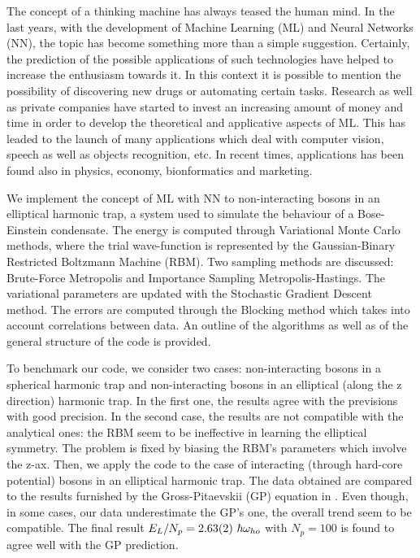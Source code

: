 The concept of a thinking machine has always teased the human mind. In the last years, with the development of Machine Learning (ML) and Neural Networks (NN), the topic has become something more than a simple suggestion. Certainly, the  prediction of the possible applications of such technologies have helped to increase the enthusiasm towards it. In this context it is possible to mention the possibility of discovering new drugs or automating certain tasks.
Research as well as private companies have started to invest an increasing amount of money and time in order to develop the theoretical and applicative aspects of ML. This has leaded to the launch of many applications which deal with computer vision, speech as well as objects recognition, etc. In recent times, applications has been found also in physics, economy, bionformatics and marketing.


We implement the concept of ML with NN to non-interacting bosons in an elliptical harmonic trap, a system used to simulate the behaviour of a Bose-Einstein condensate. The energy is computed through Variational Monte Carlo methods, where the trial wave-function is represented by the Gaussian-Binary Restricted Boltzmann Machine (RBM). Two sampling methods are discussed: Brute-Force Metropolis and Importance Sampling Metropolis-Hastings. The variational parameters are updated with the Stochastic Gradient Descent method. The errors are computed through the Blocking method which takes into account correlations between data. An outline of the algorithms as well as of the general structure of the code is provided. 

To benchmark our code, we consider two cases: non-interacting bosons in a spherical harmonic trap and non-interacting bosons in an elliptical (along the z direction) harmonic trap. In the first one, the results agree with the previsions with good precision. In the second case, the results are not compatible with the analytical ones: the RBM seem to be ineffective in learning the elliptical symmetry. The problem is fixed by biasing the RBM's parameters which involve the z-ax. Then, we apply the code to the case of interacting (through hard-core potential) bosons in an elliptical harmonic trap. The data obtained are compared to the results furnished by the Gross-Pitaevskii (GP) equation in \cite{DalfString}. Even though, in some cases, our data underestimate the GP's one, the overall trend seem to be compatible. The final result $E_L/N_p=\SI{2.63\pm 0.02}{}\ \hbar \omega_{ho}$ with $N_p=100$ is found to agree well with the GP prediction.
 
 

